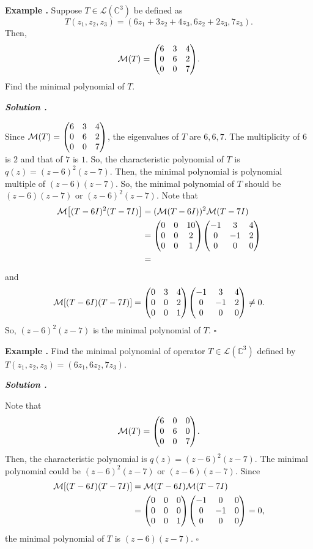 \documentclass[11pt, letterpaper]{article}
\newcounter{index}[subsection]
\newenvironment*{eg}{\begin{framed}\par\noindent\textbf{Example \thesubsection.\stepcounter{index}\theindex}}{\par\end{framed}}
\newcounter{nprf}[subsection]
\newenvironment*{sol}{\par\indent\textbf{\textit{Solution \stepcounter{nprf}\thenprf.}}\par}{\hfill{$\square$}\par}
\def\C{\mathbb{C}}
\def\L{\mathcal{L}}
\def\M{\mathcal{M}}
\begin{document}
\begin{eg}
	Suppose $T\in\L(\C^3)$ be defined as \[T(z_1,z_2,z_3)=(6z_1+3z_2+4z_3,6z_2+2z_3,7z_3).\]	 Then, \[\M(T)=\mqty(6&3&4\\0&6&2\\0&0&7).\] Find the minimal polynomial of $T$. 
	\begin{sol}
		Since $\M(T)=\mqty(6&3&4\\0&6&2\\0&0&7)$, the eigenvalues of $T$ are $6, 6, 7$. The multiplicity of $6$ is $2$ and that of $7$ is $1$. So, the characteristic polynomial of $T$ is $q(z)=(z-6)^2(z-7)$. Then, the minimal polynomial is polynomial multiple of $(z-6)(z-7)$. So, the minimal polynomial of $T$ should be $(z-6)(z-7)$ or $(z-6)^2(z-7)$. Note that \[\begin{aligned}\M\qty[(T-6I)^2(T-7I)]&=(\M(T-6I))^2\M(T-7I)\\&=\mqty(0&0&10\\0&0&2\\0&0&1)\mqty(-1&3&4\\0&-1&2\\0&0&0)\\&=\end{aligned}\] and \[\M\qty[(T-6I)(T-7I)]=\mqty(0&3&4\\0&0&2\\0&0&1)\mqty(-1&3&4\\0&-1&2\\0&0&0)\neq0.\] So, $(z-6)^2(z-7)$ is the minimal polynomial of $T$. 
	\end{sol}
\end{eg}
\begin{eg}
	Find the minimal polynomial of operator $T\in\L(\C^3)$ defined by $T(z_1,z_2,z_3)=(6z_1,6z_2,7z_3)$.
	\begin{sol}
		Note that \[\M(T)=\mqty(6&0&0\\0&6&0\\0&0&7).\] Then, the characteristic polynomial is $q(z)=(z-6)^2(z-7)$. The minimal polynomial could be $(z-6)^2(z-7)$ or $(z-6)(z-7)$. Since \[\begin{aligned}\M[(T-6I)(T-7I)]&=\M(T-6I)\M(T-7I)\\&=\mqty(0&0&0\\0&0&0\\0&0&1)\mqty(-1&0&0\\0&-1&0\\0&0&0)=0,\end{aligned}\] the minimal polynomial of $T$ is $(z-6)(z-7)$.
	\end{sol}
\end{eg}
\end{document}
